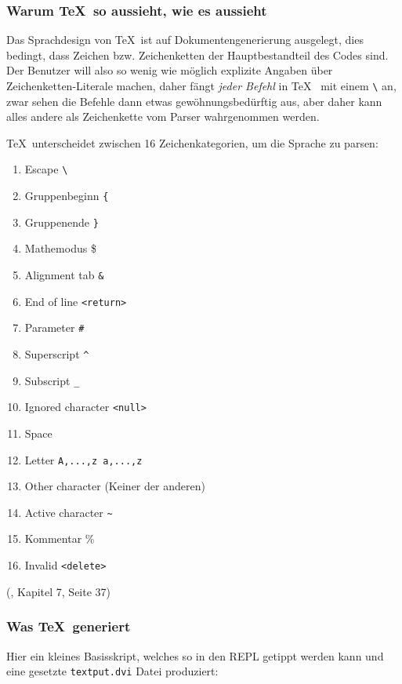 \subsubsection{Warum \TeX~so aussieht, wie es aussieht}

Das Sprachdesign von \TeX~ist auf Dokumentengenerierung ausgelegt, dies
bedingt, dass Zeichen bzw. Zeichenketten der Hauptbestandteil des Codes
sind. Der Benutzer will also so wenig wie möglich explizite Angaben über
Zeichenketten-Literale machen, daher fängt \emph{jeder Befehl} in \TeX~
mit einem \lstinline|\| an, zwar sehen die Befehle dann etwas gewöhnungsbedürftig
aus, aber daher kann alles andere als Zeichenkette vom Parser
wahrgenommen werden.

\TeX~unterscheidet zwischen 16 Zeichenkategorien, um die Sprache zu parsen:

\begin{enumerate}
  \item Escape \lstinline|\|
  \item Gruppenbeginn \lstinline|{|
  \item Gruppenende \lstinline|}|
  \item Mathemodus \$
  \item Alignment tab \lstinline|&|
  \item End of line \lstinline|<return>|
  \item Parameter \lstinline|#|
  \item Superscript \lstinline|^|
  \item Subscript \lstinline|_|
  \item Ignored character \lstinline|<null>|
  \item Space
  \item Letter \lstinline|A,...,z a,...,z|
  \item Other character (Keiner der anderen)
  \item Active character \lstinline|~|
  \item Kommentar \%
  \item Invalid \lstinline|<delete>|
\end{enumerate}

(\cite{tex-a}, Kapitel 7, Seite 37)

\subsubsection{Was \TeX~generiert}

Hier ein kleines Basisskript, welches so in den REPL getippt werden kann und
eine gesetzte \lstinline|textput.dvi| Datei produziert:

